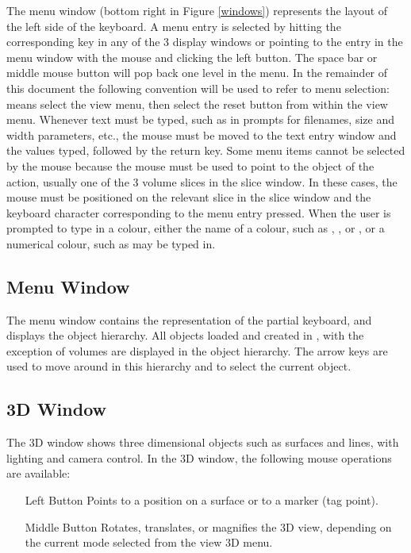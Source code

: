 The menu window (bottom right in Figure \ref{windows}) represents the layout
of the left side of the keyboard.  A menu entry is selected by hitting the
corresponding key in any of the 3 display windows or pointing to the entry
in the menu window with the mouse and clicking the left button.
The space bar or middle mouse
button will pop back one level in the menu.  In the remainder of this document
the following convention will be used to refer to menu selection:
 means select the view menu, then select the reset button
from within the view menu.  Whenever text must be typed, such as in prompts
for filenames, size and width parameters, etc., the mouse must be moved to the
text entry window and the values typed, followed by the return key.
Some menu items cannot be selected by the mouse because the mouse must be
used to point to the object of the action, usually one of the 3 volume slices
in the slice window.
In these cases, the mouse must be positioned on the relevant slice in
the slice window and the
keyboard character corresponding to the menu entry pressed.
When the user is prompted to type in a colour, either the name of a colour,
such as , , or , or a numerical colour,
such as \mbox{} may be typed in.

\subsection{Menu Window}

The menu window contains the representation of the partial keyboard, and
displays the object hierarchy.  All objects loaded and created in \display,
with the exception of volumes are displayed in the object hierarchy.  The
arrow keys are used to move around in this hierarchy and to select the
current object.

\subsection{3D Window}

The 3D window shows three dimensional objects such as surfaces and
lines, with lighting and camera control.  In the 3D window, the following
mouse operations are available:

\begin{itemize}
\item[Left Button]  Points to a position on a surface or to a marker
                    (tag point).
\item[Middle Button]  Rotates, translates, or magnifies the 3D view, depending
                      on the current mode selected from the view 3D menu.
\end{itemize}

